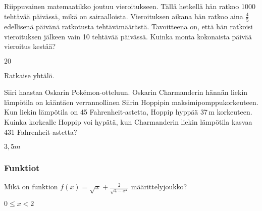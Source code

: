\begin{tehtava}
	Riippuvainen matemaatikko joutuu vieroitukseen. Tällä hetkellä hän ratkoo 1000 tehtävää päivässä, mikä on sairaalloista. Vieroituksen aikana hän ratkoo aina $\frac{4}{5}$ edellisenä päivänä ratkotusta tehtävämäärästä. Tavoitteena on, että hän ratkoisi vieroituksen jälkeen vain 10 tehtävää päivässä. Kuinka monta kokonaista päivää vieroitus kestää?
	

\begin{vastaus}
	$20$
\end{vastaus}
\end{tehtava}

\begin{tehtava}
	Ratkaise yhtälö.
	\begin{alakohdat}
	
	\end{alakohdat}
	

\begin{vastaus}
	\begin{alakohdat}
		\alakohta{$x=-6$}
		\alakohta{$x=-\frac{5}{9}$}
		
	\end{alakohdat}
\end{vastaus}
\end{tehtava}

\begin{tehtava}
	Siiri haastaa Oskarin Pokémon-otteluun. Oskarin Charmanderin hännän liekin lämpötila on kääntäen verrannollinen Siirin Hoppipin maksimipomppukorkeuteen. Kun liekin lämpötila on 45 Fahrenheit-astetta, Hoppip hyppää 37\,m korkeuteen. Kuinka korkealle Hoppip voi hypätä, kun Charmanderin liekin lämpötila kasvaa 431 Fahrenheit-astetta?
	

\begin{vastaus}
	$3,5m$
\end{vastaus}
\end{tehtava}



\subsubsection*{Funktiot}

\begin{tehtava}
	Mikä on funktion $f(x)=\sqrt{x}+\frac{2}{\sqrt{4-x²}}$ määrittelyjoukko?
	

\begin{vastaus}
	{$0\leq x<2$}
		
\end{vastaus}
\end{tehtava}

